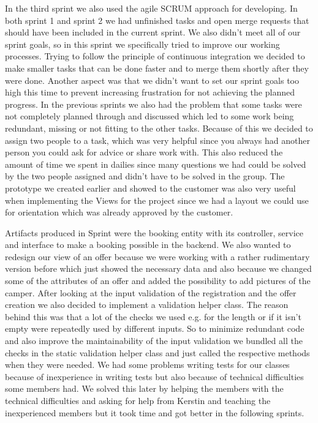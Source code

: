In the third sprint we also used the agile SCRUM approach for developing.
In both sprint 1 and sprint 2 we had unfinished tasks and open merge requests that should have been included in the current sprint.
We also didn't meet all of our sprint goals, so in this sprint we specifically tried to improve our working processes.
Trying to follow the principle of continuous integration we decided to make smaller tasks that can be done faster and to merge them shortly after they were done.
Another aspect was that we didn't want to set our sprint goals too high this time to prevent increasing frustration for not achieving the planned progress.
In the previous sprints we also had the problem that some tasks were not completely planned through and discussed which led to some work being redundant, missing or not fitting to the other tasks.
Because of this we decided to assign two people to a task, which was very helpful since you always had another person you could ask for advice or share work with.
This also reduced the amount of time we spent in dailies since many questions we had could be solved by the two people assigned and didn't have to be solved in the group.
The prototype we created earlier and showed to the customer was also very useful when implementing the Views for the project since we had a layout we could use for orientation which was already approved by the customer.

Artifacts produced in Sprint were the booking entity with its controller, service and interface to make a booking possible in the backend.
We also wanted to redesign our view of an offer because we were working with a rather rudimentary version before which just showed the necessary data and also because we changed some of the attributes of an offer and added the possibility to add pictures of the camper.
After  looking at the input validation of the registration and the offer creation we also decided to implement a validation helper class.
The reason behind this was that a lot of the checks we used e.g. for the length or if it isn't empty were repeatedly used by different inputs.
So to minimize redundant code and also improve the maintainability of the input validation we bundled all the checks in the static validation helper class and just called the respective methods when they were needed.
We had some problems writing tests for our classes because of inexperience in writing tests but also because of technical difficulties some members had.
We solved this later by helping the members with the technical difficulties and asking for help from Kerstin and teaching the inexperienced members but it took time and got better in the following sprints.

